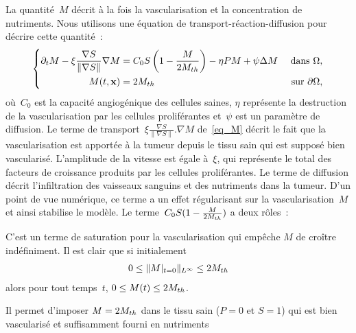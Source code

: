 \documentclass[main.tex]{subfiles}
\begin{document}
La quantité~$M$ décrit à la fois la vascularisation et la concentration de nutriments. Nous utilisons une équation de transport-réaction-diffusion pour décrire cette quantité~:
\begin{equation}\label{eq_M}
\left\{
\begin{aligned}
\partial_t M - \xi \frac{\nabla S}{\| \nabla S \|}\nabla M &= C_0 S
\left(1-\frac{M}{2M_{th}}\right) - \eta PM +\psi \Delta M & \textrm{ dans } \Omega, \\
M(t,\mathbf{x})&= 2M_{th} & \textrm{ sur } \partial \Omega,
\end{aligned}
\right.
\end{equation}
où~$C_0$ est la capacité angiogénique des cellules saines, 
$\eta$ représente la destruction de la vascularisation par les cellules proliférantes et~$\psi$ est un paramètre de diffusion.  
Le terme de transport~$\xi \frac{\nabla S}{\| \nabla S \|}. \nabla M$ de~\eqref{eq_M} décrit le fait que la vascularisation est apportée à la tumeur depuis le tissu sain qui est supposé bien vascularisé.  
L'amplitude de la vitesse est égale à~$\xi$, qui représente le total des facteurs de croissance produits par les cellules proliférantes. 
Le terme de diffusion décrit l'infiltration des vaisseaux sanguins et des nutriments dans la tumeur. D'un point de vue numérique, ce terme a un effet régularisant sur la vascularisation~$M$ et ainsi stabilise le modèle. 
Le terme~$C_0S(1-\frac{M}{2M_{th}})$ a deux rôles~:
\begin{myitemize}
\item C'est un terme de saturation pour la vascularisation qui empêche $M$ de croître indéfiniment. 
Il est clair que si initialement 
\begin{align}\label{eq:borneM}
0\leq \|M|_{t=0}\|_{L^\infty}\leq 2M_{th}
\end{align}
alors pour tout temps~$t$, $0\leq M(t) \leq 2M_{th}$. 
\item Il permet d'imposer $M=2M_{th}$ dans le tissu sain ($P=0$ et $S=1$) qui est bien vascularisé et suffisamment fourni en nutriments
\end{myitemize}
\end{document}
